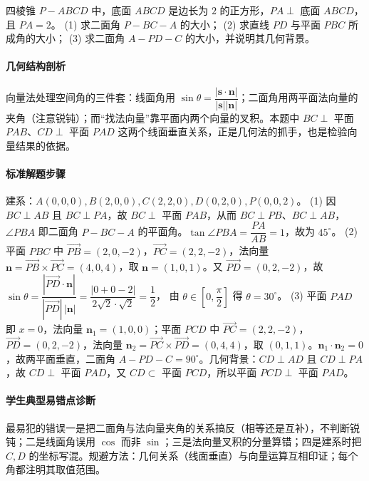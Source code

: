 \begin{problem}
四棱锥 $P-ABCD$ 中，底面 $ABCD$ 是边长为 $2$ 的正方形，$PA\perp$ 底面 $ABCD$，且 $PA=2$。
(1) 求二面角 $P-BC-A$ 的大小；
(2) 求直线 $PD$ 与平面 $PBC$ 所成角的大小；
(3) 求二面角 $A-PD-C$ 的大小，并说明其几何背景。
\end{problem}
\begin{solution}
\paragraph{几何结构剖析}
向量法处理空间角的三件套：线面角用 $\sin\theta=\dfrac{|\bm s\cdot\bm n|}{|\bm s||\bm n|}$；二面角用两平面法向量的夹角（注意锐钝）；而“找法向量”靠平面内两个向量的叉积。本题中 $BC\perp$ 平面 $PAB$、$CD\perp$ 平面 $PAD$ 这两个线面垂直关系，正是几何法的抓手，也是检验向量结果的依据。
\paragraph{标准解题步骤}
建系：$A(0,0,0),B(2,0,0),C(2,2,0),D(0,2,0),P(0,0,2)$。
(1) 因 $BC\perp AB$ 且 $BC\perp PA$，故 $BC\perp$ 平面 $PAB$，从而 $BC\perp PB$、$BC\perp AB$，$\angle PBA$ 即二面角 $P-BC-A$ 的平面角。$\tan\angle PBA=\dfrac{PA}{AB}=1$，故为 $45^\circ$。
(2) 平面 $PBC$ 中 $\overrightarrow{PB}=(2,0,-2)$，$\overrightarrow{PC}=(2,2,-2)$，法向量 $\bm n=\overrightarrow{PB}\times\overrightarrow{PC}=(4,0,4)$，取 $\bm n=(1,0,1)$。又 $\overrightarrow{PD}=(0,2,-2)$，故
$\sin\theta=\dfrac{|\overrightarrow{PD}\cdot\bm n|}{|\overrightarrow{PD}|\,|\bm n|}=\dfrac{|0+0-2|}{2\sqrt2\cdot\sqrt2}=\dfrac12$，
由 $\theta\in\left[0,\dfrac\pi2\right]$ 得 $\theta=30^\circ$。
(3) 平面 $PAD$ 即 $x=0$，法向量 $\bm n_1=(1,0,0)$；平面 $PCD$ 中 $\overrightarrow{PC}=(2,2,-2)$，$\overrightarrow{PD}=(0,2,-2)$，法向量 $\bm n_2=\overrightarrow{PC}\times\overrightarrow{PD}=(0,4,4)$，取 $(0,1,1)$。$\bm n_1\cdot\bm n_2=0$，故两平面垂直，二面角 $A-PD-C=90^\circ$。几何背景：$CD\perp AD$ 且 $CD\perp PA$，故 $CD\perp$ 平面 $PAD$，又 $CD\subset$ 平面 $PCD$，所以平面 $PCD\perp$ 平面 $PAD$。
\paragraph{学生典型易错点诊断}
最易犯的错误一是把二面角与法向量夹角的关系搞反（相等还是互补），不判断锐钝；二是线面角误用 $\cos$ 而非 $\sin$；三是法向量叉积的分量算错；四是建系时把 $C,D$ 的坐标写混。规避方法：几何关系（线面垂直）与向量运算互相印证；每个角都注明其取值范围。
\end{solution}

